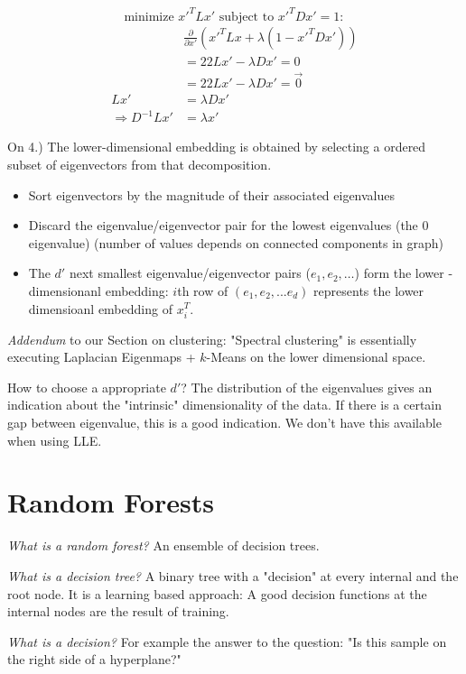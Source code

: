 \documentclass{scrartcl}
\begin{document}
\[\text{minimize } x'^T L x' \text{ subject to } x'^T D x' = 1:\]
\begin{align*}
    &\frac{\partial}{\partial x'} (x'^T L x + \lambda (1-x'^T D x'))\\
    &= 2 2 L x' - \lambda D x' = 0\\
    &= 2 2 L x' - \lambda D x' = \vec{0}\\
    Lx' &= \lambda D x'\\
    \Rightarrow D^{-1} L x' &= \lambda x'
\end{align*}

On 4.) The lower-dimensional embedding is obtained by selecting a ordered subset of eigenvectors from that decomposition.
\begin{itemize}
    \item
        Sort eigenvectors by the magnitude of their associated eigenvalues 
    \item
        Discard the eigenvalue/eigenvector pair for the lowest eigenvalues (the 0 eigenvalue) (number of values depends on connected components in graph)
    \item
        The \(d'\) next smallest eigenvalue/eigenvector pairs (\(e_1, e_2, \dots\)) form the lower -dimensionanl embedding: \(i\)th row of \((e_1, e_2, ... e_d)\) represents the lower dimensioanl embedding of \(x_i^T\).
\end{itemize}

\textit{Addendum} to our Section on clustering: "Spectral clustering" is essentially executing Laplacian Eigenmaps + \(k\)-Means on the lower dimensional space.

How to choose a appropriate \(d'\)? The distribution of the eigenvalues gives an indication about the "intrinsic" dimensionality of the data. If there is a certain gap between eigenvalue, this is a good indication. We don't have this available when using LLE.
\section{Random Forests}
\textit{What is a random forest?} An ensemble of decision trees.

\textit{What is a decision tree?} A binary tree with a "decision" at every internal and the root node. It is a learning based approach: A good decision functions at the internal nodes are the result of training.

\textit{What is a decision?} For example the answer to the question: "Is this sample on the right side of a hyperplane?"
\end{document}
